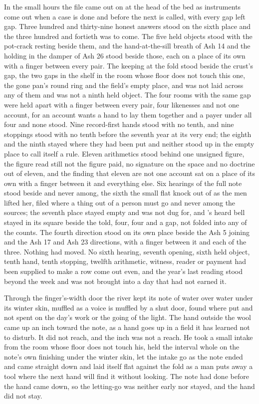 In the small hours the file came out on  at the head of the bed as instruments come out when a case is done and before the next is called, with every gap left gap. Three hundred and thirty-nine honest answers stood on the sixth place and the three hundred and fortieth was to come. The five held objects stood with the pot-crack resting beside them, and the hand-at-the-sill breath of Ash 14 and the holding in the damper of Ash 26 stood beside those, each on a place of its own with a finger between every pair. The keeping at the fold stood beside the crust's gap, the two gaps in the shelf in the room whose floor does not touch this one, the gone pan's round ring and the field's empty place, and was not laid across any of them and was not a ninth held object. The four rooms with the same gap were held apart with a finger between every pair, four likenesses and not one account, for an account wants a hand to lay them together and a payer under all four and none stood. Nine record-first hands stood with no tenth, and nine stoppings stood with no tenth before the seventh year at its very end; the eighth and the ninth stayed where they had been put and neither stood up in the empty place to call itself a rule. Eleven arithmetics stood behind one unsigned figure, the figure read still not the figure paid, no signature on the space and no doctrine out of eleven, and the finding that eleven are not one account sat on a place of its own with a finger between it and everything else. Six hearings of the full note stood beside and never among, the sixth the small flat knock out of  as the men lifted her, filed where a thing out of a person must go and never among the sources; the seventh place stayed empty and was not dug for, and 's heard bell stayed in its square beside the told, four, four and a gap, not folded into any of the counts. The fourth direction stood on its own place beside the Ash 5 joining and the Ash 17 and Ash 23 directions, with a finger between it and each of the three. Nothing had moved. No sixth hearing, seventh opening, sixth held object, tenth hand, tenth stopping, twelfth arithmetic, witness, reader or payment had been supplied to make a row come out even, and the year's last reading stood beyond the week and was not brought into a day that had not earned it.

Through the finger's-width door the river kept its note of water over water under its winter skin, muffled as a voice is muffled by a shut door, found where put and not spent on the day's work or the going of the light. The hand outside the wool came up an inch toward the note, as a hand goes up in a field it has learned not to disturb. It did not reach, and the inch was not a reach. He took a small intake from the room whose floor does not touch his, held the interval whole on the note's own finishing under the winter skin, let the intake go as the note ended and came straight down and laid itself flat against the fold as a man puts away a tool where the next hand will find it without looking. The note had done before the hand came down, so the letting-go was neither early nor stayed, and the hand did not stay.

